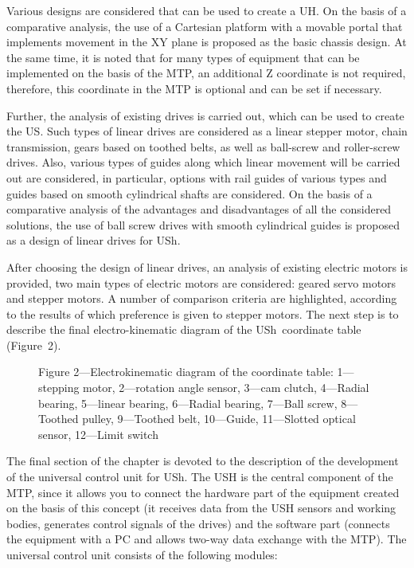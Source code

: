 Various designs are considered that can be used to create a UH. On the basis of a comparative analysis, the use of a Cartesian platform with a movable portal that implements movement in the XY plane is proposed as the basic chassis design. At the same time, it is noted that for many types of equipment that can be implemented on the basis of the MTP, an additional Z coordinate is not required, therefore, this coordinate in the MTP is optional and can be set if necessary.

Further, the analysis of existing drives is carried out, which can be used to create the US. Such types of linear drives are considered as a linear stepper motor, chain transmission, gears based on toothed belts, as well as ball-screw and roller-screw drives. Also, various types of guides along which linear movement will be carried out are considered, in particular, options with rail guides of various types and guides based on smooth cylindrical shafts are considered. On the basis of a comparative analysis of the advantages and disadvantages of all the considered solutions, the use of ball screw drives with smooth cylindrical guides is proposed as a design of linear drives for USh.

After choosing the design of linear drives, an analysis of existing electric motors is provided, two main types of electric motors are considered: geared servo motors and stepper motors. A number of comparison criteria are highlighted, according to the results of which preference is given to stepper motors. The next step is to describe the final electro-kinematic diagram of the USh~coordinate table (Figure~2).

\begin{figure} [ht]
\caption *{Figure 2---Electrokinematic diagram of the coordinate table: 1---stepping motor, 2---rotation angle sensor, 3---cam clutch, 4---Radial bearing, 5---linear bearing, 6---Radial bearing, 7---Ball screw, 8---Toothed pulley, 9---Toothed belt, 10---Guide, 11---Slotted optical sensor, 12---Limit switch} \label{fig: scheme}
\end{figure}

The final section of the chapter is devoted to the description of the development of the universal control unit for USh. The USH is the central component of the MTP, since it allows you to connect the hardware part of the equipment created on the basis of this concept (it receives data from the USH sensors and working bodies, generates control signals of the drives) and the software part (connects the equipment with a PC and allows two-way data exchange with the MTP). The universal control unit consists of the following modules:

